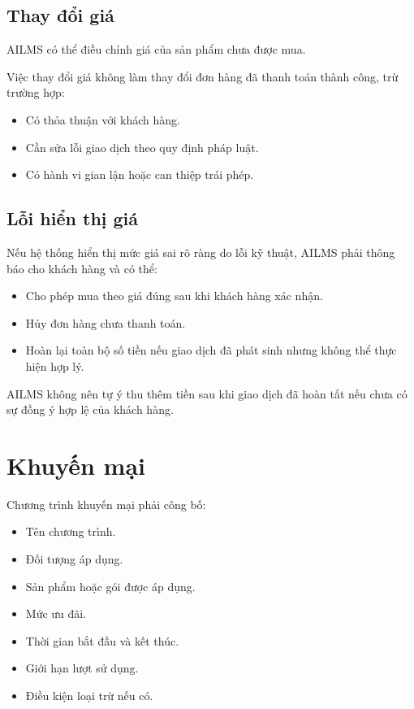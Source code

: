 \documentclass[12pt,a4paper]{article}
\begin{document}
\subsection{Thay đổi giá}

AILMS có thể điều chỉnh giá của sản phẩm chưa được mua.

Việc thay đổi giá không làm thay đổi đơn hàng đã thanh toán thành công,
trừ trường hợp:

\begin{itemize}
    \item Có thỏa thuận với khách hàng.
    \item Cần sửa lỗi giao dịch theo quy định pháp luật.
    \item Có hành vi gian lận hoặc can thiệp trái phép.
\end{itemize}

\subsection{Lỗi hiển thị giá}

Nếu hệ thống hiển thị mức giá sai rõ ràng do lỗi kỹ thuật,
AILMS phải thông báo cho khách hàng và có thể:

\begin{itemize}
    \item Cho phép mua theo giá đúng sau khi khách hàng xác nhận.
    \item Hủy đơn hàng chưa thanh toán.
    \item Hoàn lại toàn bộ số tiền nếu giao dịch đã phát sinh
    nhưng không thể thực hiện hợp lý.
\end{itemize}

AILMS không nên tự ý thu thêm tiền sau khi giao dịch đã hoàn tất
nếu chưa có sự đồng ý hợp lệ của khách hàng.

\section{Khuyến mại}

Chương trình khuyến mại phải công bố:

\begin{itemize}
    \item Tên chương trình.
    \item Đối tượng áp dụng.
    \item Sản phẩm hoặc gói được áp dụng.
    \item Mức ưu đãi.
    \item Thời gian bắt đầu và kết thúc.
    \item Giới hạn lượt sử dụng.
    \item Điều kiện loại trừ nếu có.
\end{itemize}
\end{document}
